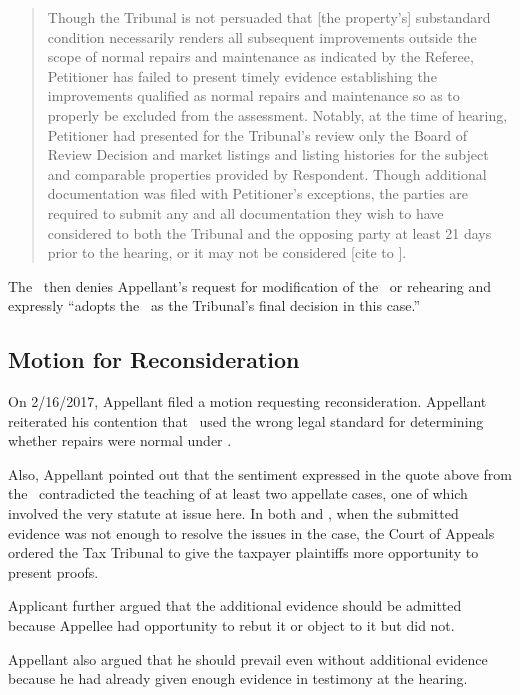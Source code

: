 \documentclass[12pt,\documentclassflag]{michiganCourtOfAppealsBrief}
\def\mathieuGast{\pincite[l]{MCL}{211.27(2)}}
\def\ttr287{\pincite[s]{TTR}{287}}
\begin{document}
\begin{quote}%
Though the Tribunal is not persuaded that [the property's] substandard condition necessarily renders all subsequent improvements outside the scope of normal repairs and maintenance as indicated by the Referee, Petitioner has failed to present timely evidence establishing the improvements qualified as normal repairs and maintenance so as to properly be excluded from the assessment. Notably, at the time of hearing, Petitioner had presented for the Tribunal's review only the Board of Review Decision and market listings and listing histories for the subject and comparable properties provided by Respondent. Though additional documentation was filed with Petitioner's exceptions, the parties are required to submit any and all documentation they wish to have considered to both the Tribunal and the opposing party at least 21 days prior to the hearing, or it may not be considered [cite to \ttr287].
\end{quote}

The \FOJ\ then denies Appellant's request for modification of the \POJ\ or rehearing and expressly ``adopts the \POJ\ as the Tribunal's final decision in this case.''

\subsection{Motion for Reconsideration}

On 2/16/2017, Appellant filed a motion requesting reconsideration. Appellant reiterated his contention that \POJ\ used the wrong legal standard for determining whether repairs were normal under \mathieuGast.

Also, Appellant pointed out that the sentiment expressed in the quote above from the \FOJ\ contradicted the teaching of at least two appellate cases, one of which involved the very statute at issue here. In both \cite{Jones & Laughlin} and \cite[s]{Fisher}, when the submitted evidence was not enough to resolve the issues in the case, the Court of Appeals ordered the Tax Tribunal to give the taxpayer plaintiffs more opportunity to present proofs. 

Applicant further argued that the additional evidence should be admitted because Appellee had opportunity to rebut it or object to it but did not.

Appellant also argued that he should prevail even without additional evidence because  he had already given enough evidence in testimony at the hearing.
\end{document}
